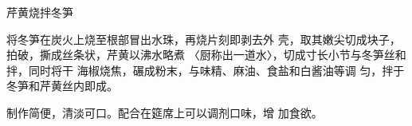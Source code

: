\begin{recipe}{芹黄烧拌冬笋}

\ingredients


\cooking

将冬笋在炭火上烧至根部冒出水珠，再烧片刻即剥去外 壳，取其嫩尖切成块子，拍破，撕成丝条状，芹黄以沸水略煮 〈厨称出一道水〉，切成寸长小节与冬笋丝和拌，同时将干 海椒烧焦，碾成粉末，与味精、麻油、食盐和白酱油等调 匀，拌于冬笋和芹黄丝内即成。

\notes

制作简便，清淡可口。配合在筵席上可以调剂口味，增 加食欲。

\end{recipe}

